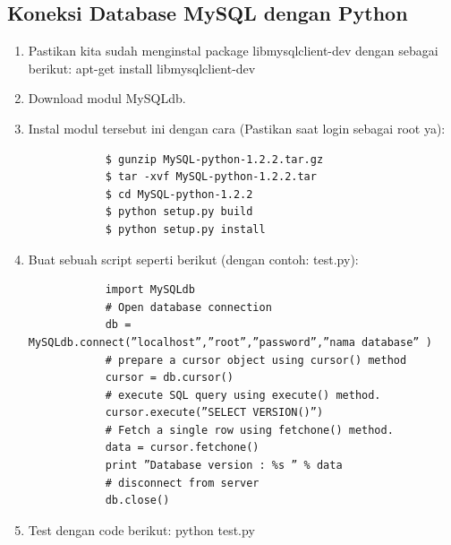 \subsection {Koneksi Database MySQL dengan Python}
	\begin{enumerate}
		\item  Pastikan kita sudah menginstal package libmysqlclient-dev dengan sebagai berikut: 
		       apt-get install libmysqlclient-dev 
		\item  Download modul MySQLdb.
		\item  Instal modul tersebut ini dengan cara (Pastikan saat login sebagai root ya):
	    \begin{verbatim}
			$ gunzip MySQL-python-1.2.2.tar.gz 
			$ tar -xvf MySQL-python-1.2.2.tar 
			$ cd MySQL-python-1.2.2 
			$ python setup.py build 
			$ python setup.py install 
		\end{verbatim}
		\item  Buat sebuah script seperti berikut (dengan contoh: test.py):
		    \begin{verbatim}
			import MySQLdb 
			# Open database connection 
			db = MySQLdb.connect(”localhost”,”root”,”password”,”nama database” ) 
			# prepare a cursor object using cursor() method 
			cursor = db.cursor() 
			# execute SQL query using execute() method. 
			cursor.execute(”SELECT VERSION()”) 
			# Fetch a single row using fetchone() method. 
			data = cursor.fetchone() 
			print ”Database version : %s ” % data 
			# disconnect from server 
			db.close()
			\end{verbatim}
		\item Test dengan code berikut:
		      python test.py 
	\end{enumerate}
	
